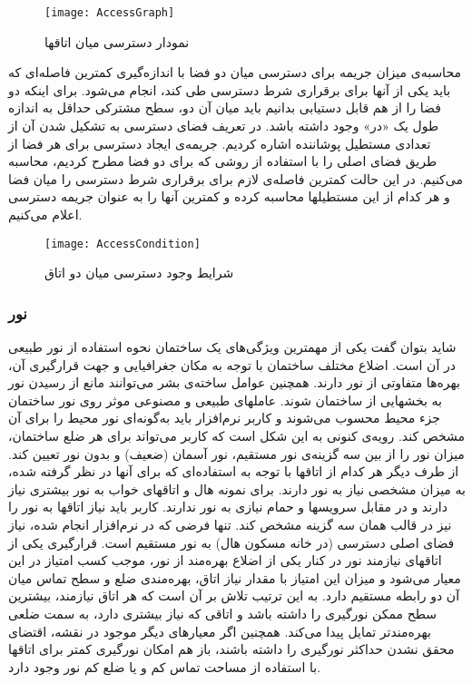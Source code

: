 \documentclass{report}
\begin{document}
\begin{figure}[h] \centerline{\texttt{[image: AccessGraph]}} \caption{\label{fAccessGraph}
نمودار دسترسی میان اتاقها
 } \end{figure}

محاسبه‌ی میزان جریمه برای دسترسی میان دو فضا با اندازه‌گیری کمترین فاصله‌ای که باید یکی از آنها برای برقراری شرط دسترسی طی کند، انجام می‌شود. برای اینکه دو فضا را از هم قابل دستیابی بدانیم باید میان آن دو، سطح مشترکی حداقل به اندازه طول یک «در» وجود داشته باشد.
در تعریف فضای دسترسی به تشکیل شدن آن از تعدادی مستطیل پوشاننده اشاره کردیم. جریمه‌ی ایجاد دسترسی برای هر فضا از طریق فضای اصلی را با استفاده از روشی که برای دو فضا مطرح کردیم، محاسبه می‌کنیم. در این حالت کمترین فاصله‌ی لازم برای برقراری شرط دسترسی را میان فضا و هر کدام از این مستطیلها محاسبه کرده و کمترین آنها را به عنوان جریمه دسترسی اعلام می‌کنیم.

\begin{figure}[h] \centerline{\texttt{[image: AccessCondition]}} \caption{\label{fAccessCondition}
شرایط وجود دسترسی میان دو اتاق
 } \end{figure}

\subsubsection{نور}
شاید بتوان گفت یکی از مهمترین ویژگی‌های یک ساختمان نحوه استفاده از نور طبیعی در آن است. اضلاع مختلف ساختمان با توجه به مکان جغرافیایی و جهت قرارگیری آن، بهره‌ها متفاوتی از نور دارند. همچنین عوامل ساخته‌ی بشر می‌توانند مانع از رسیدن نور به بخشهایی از ساختمان شوند. عاملهای طبیعی و مصنوعی موثر روی نور ساختمان جزء محیط محسوب می‌شوند و کاربر نرم‌افزار باید به‌گونه‌ای نور محیط را برای آن مشخص کند. رویه‌ی کنونی به این شکل است که کاربر می‌تواند برای هر ضلع ساختمان، میزان نور را از بین سه گزینه‌ی نور مستقیم، نور آسمان (ضعیف) و بدون نور تعیین کند.
از طرف دیگر هر کدام از اتاقها با توجه به استفاده‌ای که برای آنها در نظر گرفته شده، به میزان مشخصی نیاز به نور دارند. برای نمونه هال و اتاقهای خواب به نور بیشتری نیاز دارند و در مقابل سرویسها و حمام نیازی به نور ندارند. کاربر باید نیاز اتاقها به نور را نیز در قالب همان سه گزینه مشخص کند. تنها فرضی که در نرم‌افزار انجام شده، نیاز فضای اصلی دسترسی (در خانه مسکون هال) به نور مستقیم است.
قرارگیری یکی از اتاقهای نیازمند نور در کنار یکی از اضلاع بهره‌مند از نور، موجب کسب امتیاز در این معیار می‌شود و میزان این امتیاز با مقدار نیاز اتاق، بهره‌مندی ضلع و سطح تماس میان آن دو رابطه مستقیم دارد. به این ترتیب تلاش بر آن است که هر اتاق نیازمند، بیشترین سطح ممکن نورگیری را داشته باشد و اتاقی که نیاز بیشتری دارد، به سمت ضلعی بهره‌مندتر تمایل پیدا می‌کند. همچنین اگر معیارهای دیگر موجود در نقشه، اقتضای محقق نشدن حداکثر نورگیری را داشته باشند، باز هم امکان نورگیری کمتر برای اتاقها با استفاده از مساحت تماس کم و یا ضلع کم نور وجود دارد.
\end{document}
